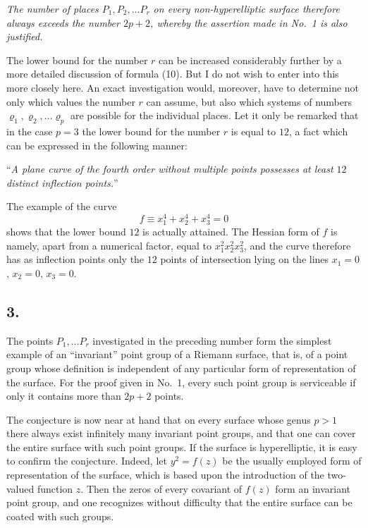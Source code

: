 \documentclass{article}
\begin{document}
\emph{The number of places $P_1, P_2, \dots P_r$ on every non-hyperelliptic surface therefore always exceeds the number $2p+2$, whereby the assertion made in No.~1 is also justified.}

The lower bound for the number $r$ can be increased considerably further by a more detailed discussion of formula (10). But I do not wish to enter into this more closely here. An exact investigation would, moreover, have to determine not only which values the number $r$ can assume, but also which systems of numbers $\varrho_1, \varrho_2, \dots \varrho_p$ are possible for the individual places. Let it only be remarked that in the case $p = 3$ the lower bound for the number $r$ is equal to $12$, a fact which can be expressed in the following manner:

``\emph{A plane curve of the fourth order without multiple points possesses at least $12$ distinct inflection points.}''

The example of the curve
\[
f \equiv x_1^4 + x_2^4 + x_3^4 = 0
\]
shows that the lower bound $12$ is actually attained. The Hessian form of $f$ is namely, apart from a numerical factor, equal to $x_1^2 x_2^2 x_3^2$, and the curve therefore has as inflection points only the $12$ points of intersection lying on the lines $x_1 = 0$, $x_2 = 0$, $x_3 = 0$.

\subsection*{3.}

The points $P_1, \dots P_r$ investigated in the preceding number form the simplest example of an ``invariant'' point group of a Riemann surface, that is, of a point group whose definition is independent of any particular form of representation of the surface. For the proof given in No.~1, every such point group is serviceable if only it contains more than $2p+2$ points.

The conjecture is now near at hand that on every surface whose genus $p > 1$ there always exist infinitely many invariant point groups, and that one can cover the entire surface with such point groups. If the surface is hyperelliptic, it is easy to confirm the conjecture. Indeed, let $y^2 = f(z)$ be the usually employed form of representation of the surface, which is based upon the introduction of the two-valued function $z$. Then the zeros of every covariant of $f(z)$ form an invariant point group, and one recognizes without difficulty that the entire surface can be coated with such groups.
\end{document}
